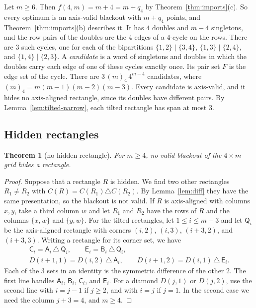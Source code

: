 \documentclass[12pt]{article}
\theoremstyle{plain}
\newtheorem{theorem}{Theorem}
\theoremstyle{definition}
\theoremstyle{remark}
\newcommand{\kA}{\mathsf{A}}
\newcommand{\kB}{\mathsf{B}}
\newcommand{\kC}{\mathsf{C}}
\newcommand{\kE}{\mathsf{E}}
\begin{document}
Let $m\ge6$. Then $f(4,m)=m+4=m+q_4$ by Theorem~\ref{thm:imports}(c). So every
optimum is an axis-valid blackout with $m+q_4$ points, and
Theorem~\ref{thm:imports}(b) describes it. It has $4$ doubles and $m-4$
singletons, and the row pairs of the doubles are the $4$ edges of a $4$-cycle
on the rows. There are $3$ such cycles, one for each of the bipartitions
$\{1,2\}\mid\{3,4\}$, $\{1,3\}\mid\{2,4\}$, and $\{1,4\}\mid\{2,3\}$. A
\emph{candidate} is a word of singletons and doubles in which the doubles carry
each edge of one of these cycles exactly once. Its pair set $F$ is the edge set
of the cycle. There are $3\,(m)_4\,4^{m-4}$ candidates, where
$(m)_4=m(m-1)(m-2)(m-3)$. Every candidate is axis-valid, and it hides no
axis-aligned rectangle, since its doubles have different pairs. By
Lemma~\ref{lem:tilted-narrow}, each tilted rectangle has span at most $3$.

\subsection{Hidden rectangles}

\begin{theorem}[no hidden rectangle]\label{thm:hidden}
For $m\ge4$, no valid blackout of the $4\times m$ grid hides a rectangle.
\end{theorem}

\begin{proof}
Suppose that a rectangle $R$ is hidden. We find two other rectangles
$R_1\ne R_2$ with $C(R)=C(R_1)\triangle C(R_2)$. By Lemma~\ref{lem:diff} they
have the same presentation, so the blackout is not valid. If $R$ is
axis-aligned with columns $x,y$, take a third column $w$ and let $R_1$ and $R_2$
have the rows of $R$ and the columns $\{x,w\}$ and $\{y,w\}$. For the tilted
rectangles, let $1\le i\le m-3$ and let $\mathsf Q_i$ be the axis-aligned
rectangle with corners $(i,2)$, $(i,3)$, $(i+3,2)$, and $(i+3,3)$. Writing a
rectangle for its corner set, we have
\begin{equation}\label{eq:fourxor}
\begin{gathered}
\kC_i=\kA_i\,\triangle\,\mathsf Q_i,\qquad \kE_i=\kB_i\,\triangle\,\mathsf Q_i,\\
D(i+1,1)=D(i,2)\,\triangle\,\kA_i,\qquad D(i+1,2)=D(i,1)\,\triangle\,\kE_i .
\end{gathered}
\end{equation}
Each of the $3$ sets in an identity is the symmetric difference of the other
$2$. The first line handles $\kA_i$, $\kB_i$, $\kC_i$, and $\kE_i$. For a
diamond $D(j,1)$ or $D(j,2)$, use the second line with $i=j-1$ if $j\ge2$, and
with $i=j$ if $j=1$. In the second case we need the column $j+3=4$, and
$m\ge4$.
\end{proof}
\end{document}

